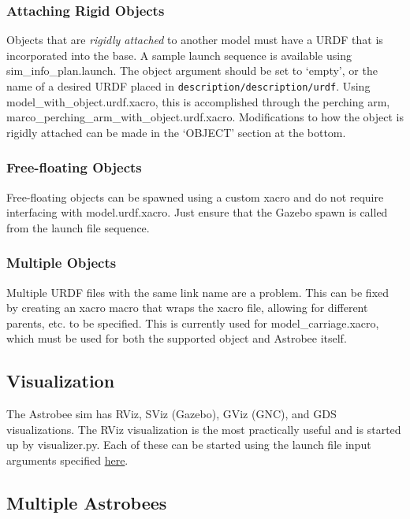 \documentclass{article}
\begin{document}
\subsubsection{Attaching Rigid Objects}

Objects that are \textit{rigidly attached} to another model must have a URDF that is incorporated into the base. A sample launch sequence is available using sim\_info\_plan.launch. The object argument should be set to `empty', or the name of a desired URDF placed in \texttt{description/description/urdf}. Using model\_with\_object.urdf.xacro, this is accomplished through the perching arm, marco\_perching\_arm\_with\_object.urdf.xacro. Modifications to how the object is rigidly attached can be made in the `OBJECT' section at the bottom.

\subsubsection{Free-floating Objects}

Free-floating objects can be spawned using a custom xacro and do not require interfacing with model.urdf.xacro. Just ensure that the Gazebo spawn is called from the launch file sequence.

\subsubsection{Multiple Objects}

Multiple URDF files with the same link name are a problem. This can be fixed by creating an xacro macro that wraps the xacro file, allowing for different parents, etc. to be specified. This is currently used for model\_carriage.xacro, which must be used for both the supported object and Astrobee itself.

\subsection{Visualization}

The Astrobee sim has RViz, SViz (Gazebo), GViz (GNC), and GDS visualizations. The RViz visualization is the most practically useful and is started up by visualizer.py. Each of these can be started using the launch file input arguments specified \href{https://github.com/nasa/astrobee/tree/master/simulation}{here}.
\\

\subsection{Multiple Astrobees}
\end{document}
